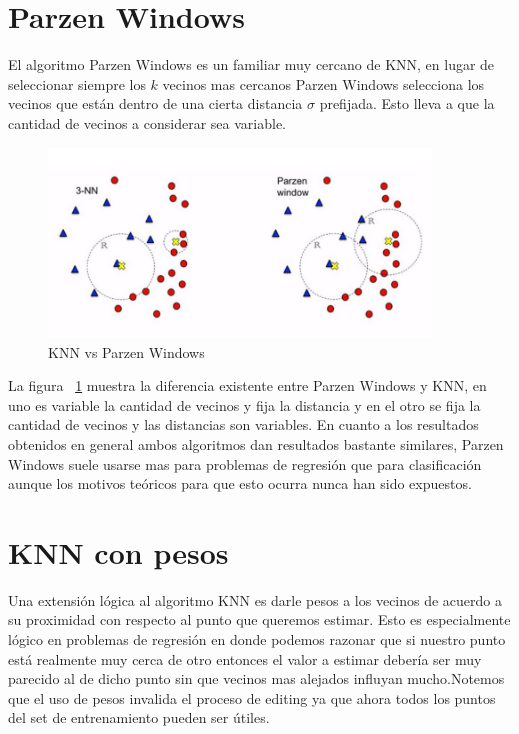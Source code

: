 \section{Parzen Windows}

El algoritmo Parzen Windows es un familiar muy cercano de KNN, en lugar de seleccionar siempre los $k$ vecinos mas cercanos Parzen Windows selecciona los vecinos que están dentro de una cierta distancia $\sigma$ prefijada. Esto lleva a que la cantidad de vecinos a considerar sea variable.

\begin{figure}[!htb]
\centering
\includegraphics[width=4in]{figures/knn-parzen-fit.png}
\caption{KNN vs Parzen Windows}
\label{fig:parzen}

\end{figure}

La figura ~\ref{fig:parzen} muestra la diferencia existente entre Parzen Windows y KNN, en uno es variable la cantidad de vecinos y fija la distancia y en el otro se fija la cantidad de vecinos y las distancias son variables.
En cuanto a los resultados obtenidos en general ambos algoritmos dan resultados bastante similares, Parzen Windows suele usarse mas para problemas de regresión que para clasificación aunque los motivos teóricos para que esto ocurra nunca han sido expuestos.

\section{KNN con pesos}

Una extensión lógica al algoritmo KNN es darle pesos a los vecinos de acuerdo a su proximidad con respecto al punto que queremos estimar. Esto es especialmente lógico en problemas de regresión en donde podemos razonar que si nuestro punto está realmente muy cerca de otro entonces el valor a estimar debería ser muy parecido al de dicho punto sin que vecinos mas alejados influyan mucho.Notemos que el uso de pesos invalida el proceso de editing ya que ahora todos los puntos del set de entrenamiento pueden ser útiles.

